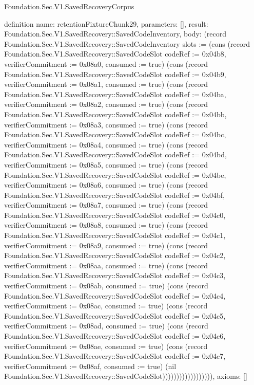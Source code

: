 \begin{lexlean}{Foundation.Sec.V1.SavedRecoveryCorpus}
\begin{semanticmodule}
definition{
  name: retentionFixtureChunk29,
  parameters: [],
  result: Foundation.Sec.V1.SavedRecovery::SavedCodeInventory,
  body: (record Foundation.Sec.V1.SavedRecovery::SavedCodeInventory {slots := (cons (record Foundation.Sec.V1.SavedRecovery::SavedCodeSlot {codeRef := 0x04b8, verifierCommitment := 0x08a0, consumed := true}) (cons (record Foundation.Sec.V1.SavedRecovery::SavedCodeSlot {codeRef := 0x04b9, verifierCommitment := 0x08a1, consumed := true}) (cons (record Foundation.Sec.V1.SavedRecovery::SavedCodeSlot {codeRef := 0x04ba, verifierCommitment := 0x08a2, consumed := true}) (cons (record Foundation.Sec.V1.SavedRecovery::SavedCodeSlot {codeRef := 0x04bb, verifierCommitment := 0x08a3, consumed := true}) (cons (record Foundation.Sec.V1.SavedRecovery::SavedCodeSlot {codeRef := 0x04bc, verifierCommitment := 0x08a4, consumed := true}) (cons (record Foundation.Sec.V1.SavedRecovery::SavedCodeSlot {codeRef := 0x04bd, verifierCommitment := 0x08a5, consumed := true}) (cons (record Foundation.Sec.V1.SavedRecovery::SavedCodeSlot {codeRef := 0x04be, verifierCommitment := 0x08a6, consumed := true}) (cons (record Foundation.Sec.V1.SavedRecovery::SavedCodeSlot {codeRef := 0x04bf, verifierCommitment := 0x08a7, consumed := true}) (cons (record Foundation.Sec.V1.SavedRecovery::SavedCodeSlot {codeRef := 0x04c0, verifierCommitment := 0x08a8, consumed := true}) (cons (record Foundation.Sec.V1.SavedRecovery::SavedCodeSlot {codeRef := 0x04c1, verifierCommitment := 0x08a9, consumed := true}) (cons (record Foundation.Sec.V1.SavedRecovery::SavedCodeSlot {codeRef := 0x04c2, verifierCommitment := 0x08aa, consumed := true}) (cons (record Foundation.Sec.V1.SavedRecovery::SavedCodeSlot {codeRef := 0x04c3, verifierCommitment := 0x08ab, consumed := true}) (cons (record Foundation.Sec.V1.SavedRecovery::SavedCodeSlot {codeRef := 0x04c4, verifierCommitment := 0x08ac, consumed := true}) (cons (record Foundation.Sec.V1.SavedRecovery::SavedCodeSlot {codeRef := 0x04c5, verifierCommitment := 0x08ad, consumed := true}) (cons (record Foundation.Sec.V1.SavedRecovery::SavedCodeSlot {codeRef := 0x04c6, verifierCommitment := 0x08ae, consumed := true}) (cons (record Foundation.Sec.V1.SavedRecovery::SavedCodeSlot {codeRef := 0x04c7, verifierCommitment := 0x08af, consumed := true}) (nil Foundation.Sec.V1.SavedRecovery::SavedCodeSlot)))))))))))))))))}),
  axioms: []
}


\end{semanticmodule}
\end{lexlean}
